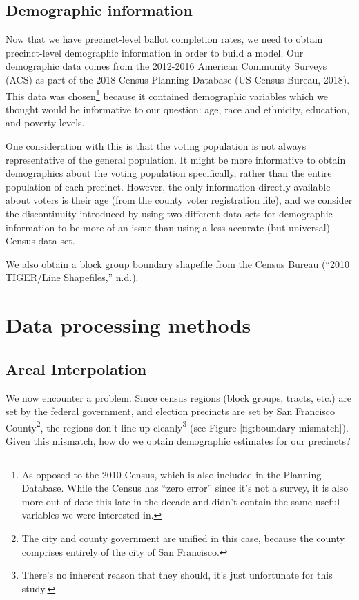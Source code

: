 \documentclass[12pt,twoside]{reedthesis}
\begin{document}
\hypertarget{demographic-information}{%
\subsection{Demographic information}\label{demographic-information}}

Now that we have precinct-level ballot completion rates, we need to obtain precinct-level demographic information in order to build a model. Our demographic data comes from the 2012-2016 American Community Surveys (ACS) as part of the 2018 Census Planning Database (US Census Bureau, 2018). This data was chosen\footnote{As opposed to the 2010 Census, which is also included in the Planning Database. While the Census has ``zero error'' since it's not a survey, it is also more out of date this late in the decade and didn't contain the same useful variables we were interested in.} because it contained demographic variables which we thought would be informative to our question: age, race and ethnicity, education, and poverty levels.

One consideration with this is that the voting population is not always representative of the general population. It might be more informative to obtain demographics about the voting population specifically, rather than the entire population of each precinct. However, the only information directly available about voters is their age (from the county voter registration file), and we consider the discontinuity introduced by using two different data sets for demographic information to be more of an issue than using a less accurate (but universal) Census data set.

We also obtain a block group boundary shapefile from the Census Bureau (``2010 TIGER/Line Shapefiles,'' n.d.).

\hypertarget{data-processing-methods}{%
\section{Data processing methods}\label{data-processing-methods}}

\hypertarget{areal-interpolation}{%
\subsection{Areal Interpolation}\label{areal-interpolation}}

We now encounter a problem. Since census regions (block groups, tracts, etc.) are set by the federal government, and election precincts are set by San Francisco County\footnote{The city and county government are unified in this case, because the county comprises entirely of the city of San Francisco.}, the regions don't line up cleanly\footnote{There's no inherent reason that they should, it's just unfortunate for this study.} (see Figure \ref{fig:boundary-mismatch}). Given this mismatch, how do we obtain demographic estimates for our precincts?
\end{document}
